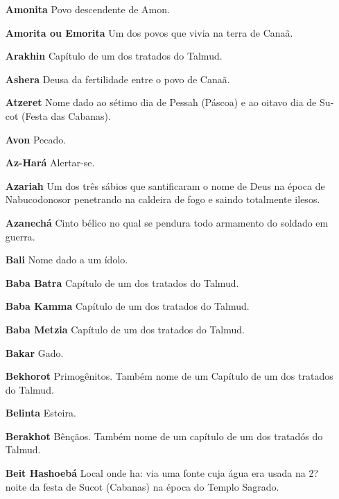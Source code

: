 \begin{itemize}
\item[\textbf{Amonita}] Povo descendente de Amon.

\item[\textbf{Amorita ou Emorita}] Um dos povos que vivia na terra de Canaã.

\item[\textbf{Arakhin}] Capítulo de um dos tratados do Talmud.

\item[\textbf{Ashera}] Deusa da fertilidade entre o povo de Canaã.

\item[\textbf{Atzeret}] Nome dado ao sétimo dia de Pessah (Páscoa) e ao
oitavo dia de Su­cot (Festa das Cabanas).

\item[\textbf{Avon}] Pecado.

\item[\textbf{Az-Hará}] Alertar-se.

\item[\textbf{Azariah}] Um dos três sábios que san­tificaram o nome de Deus
na época de Nabucodonosor penetrando na caldei­ra de fogo e saindo
totalmente ilesos.

\item[\textbf{Azanechá}] Cinto bélico no qual se pendura
todo armamento do soldado em guerra.

\item[\textbf{Bali}]  Nome dado a um ídolo.

\item[\textbf{Baba Batra}] Capítulo de um dos tra­tados do Talmud.

\item[\textbf{Baba Kamma}] Capítulo de um dos tratados do Talmud.

\item[\textbf{Baba Metzia}] Capítulo de um dos tra­tados do Talmud.

\item[\textbf{Bakar}] Gado.

\item[\textbf{Bekhorot}] Primogênitos. Também nome de um Capítulo de um dos
trata­dos do Talmud.

\item[\textbf{Belinta}] Esteira.

\item[\textbf{Berakhot}] Bênçãos. Também nome de um capítulo de um dos
tratadós do Talmud.

\item[\textbf{Beit Hashoebá}] Local onde ha: via uma fonte
cuja água era usada na 2? noite da festa de Sucot (Cabanas) na época do
Templo Sagrado.


\end{itemize}
